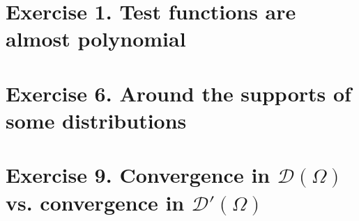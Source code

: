 \section{Exercise 1. Test functions are almost polynomial}


\setcounter{section}{5} 
\section{Exercise 6. Around the supports of some distributions}

\setcounter{section}{8} 
\section{Exercise 9. Convergence in $\mathscr{D}(\Omega)\,$ vs. convergence in $\mathscr{D}'(\Omega)\,$}

%

